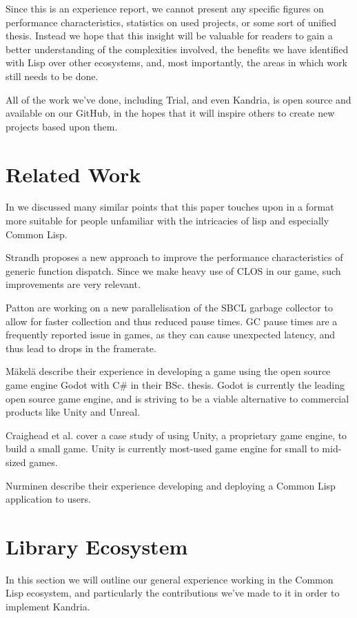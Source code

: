 \documentclass[format=sigconf]{acmart}
\begin{document}
Since this is an experience report, we cannot present any specific figures on performance characteristics, statistics on used projects, or some sort of unified thesis. Instead we hope that this insight will be valuable for readers to gain a better understanding of the complexities involved, the benefits we have identified with Lisp over other ecosystems, and, most importantly, the areas in which work still needs to be done.

All of the work we've done, including Trial\cite{trial}, and even Kandria\cite{kandria}, is open source and available on our GitHub\cite{github}, in the hopes that it will inspire others to create new projects based upon them.

\section{Related Work}\label{relatedwork}
In \cite{hafner2021} we discussed many similar points that this paper touches upon in a format more suitable for people unfamiliar with the intricacies of lisp and especially Common Lisp.

Strandh\cite{strandh2014fast} proposes a new approach to improve the performance characteristics of generic function dispatch. Since we make heavy use of CLOS in our game, such improvements are very relevant.

Patton\cite{swcl-gc} are working on a new parallelisation of the SBCL\cite{sbcl} garbage collector to allow for faster collection and thus reduced pause times. GC pause times are a frequently reported issue in games, as they can cause unexpected latency, and thus lead to drops in the framerate.

Mäkelä\cite{makela2021development} describe their experience in developing a game using the open source game engine Godot\cite{godot} with C\# in their BSc. thesis. Godot is currently the leading open source game engine, and is striving to be a viable alternative to commercial products like Unity and Unreal.

Craighead et al.\cite{craighead2008using} cover a case study of using Unity\cite{unity}, a proprietary game engine, to build a small game. Unity is currently most-used game engine for small to mid-sized games.

Nurminen\cite{nurminen1990rft} describe their experience developing and deploying a Common Lisp application to users.

\section{Library Ecosystem}\label{yaks}
In this section we will outline our general experience working in the Common Lisp ecosystem, and particularly the contributions we've made to it in order to implement Kandria.
\end{document}
